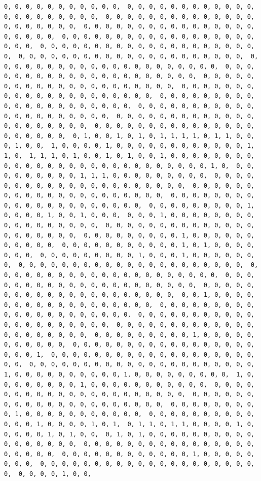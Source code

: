 \documentclass[
]{article}
\begin{document}
\begin{verbatim}
0, 0, 0, 0, 0, 0, 0, 0, 0, 0, 0,  0, 0, 0, 0, 0, 0, 0, 0, 0, 0, 0, 0, 0, 0, 0, 0, 0, 0, 0, 0, 0,  0, 0, 0, 0, 0, 0, 0, 0, 0, 0, 0, 0, 0, 0, 0, 0, 0, 0, 0, 0, 0,  0, 0, 0, 0, 0, 0, 0, 0, 0, 0, 0, 0, 0, 0, 0, 0, 0, 0, 0, 0, 0,  0, 0, 0, 0, 0, 0, 0, 0, 0, 0, 0, 0, 0, 0, 0, 0, 0, 0, 0, 0, 0,  0, 0, 0, 0, 0, 0, 0, 0, 0, 0, 0, 0, 0, 0, 0, 0, 0, 0, 0, 0, 0,  0, 0, 0, 0, 0, 0, 0, 0, 0, 0, 0, 0, 0, 0, 0, 0, 0, 0, 0, 0, 0,  0, 0, 0, 0, 0, 0, 0, 0, 0, 0, 0, 0, 0, 0, 0, 0, 0, 0, 0, 0, 0,  0, 0, 0, 0, 0, 0, 0, 0, 0, 0, 0, 0, 0, 0, 0, 0, 0, 0, 0, 0, 0,  0, 0, 0, 0, 0, 0, 0, 0, 0, 0, 0, 0, 0, 0, 0, 0, 0, 0, 0, 0, 0,  0, 0, 0, 0, 0, 0, 0, 0, 0, 0, 0, 0, 0, 0, 0, 0, 0, 0, 0, 0, 0,  0, 0, 0, 0, 0, 0, 0, 0, 0, 0, 0, 0, 0, 0, 0, 0, 0, 0, 0, 0, 0,  0, 0, 0, 0, 0, 0, 0, 0, 0, 0, 0, 0, 0, 0, 0, 0, 0, 0, 0, 0, 0,  0, 0, 0, 0, 0, 0, 0, 0, 0, 0, 0, 0, 0, 0, 0, 0, 0, 0, 0, 0, 0,  0, 0, 0, 0, 0, 0, 0, 0, 0, 0, 0, 0, 0, 0, 0, 0, 0, 0, 0, 0, 0,  0, 1, 0, 0, 1, 0, 1, 0, 1, 1, 1, 1, 0, 1, 1, 0, 0, 0, 1, 0, 0,  1, 0, 0, 0, 0, 1, 0, 0, 0, 0, 0, 0, 0, 0, 0, 0, 0, 0, 1, 1, 0,  1, 1, 1, 0, 1, 0, 0, 1, 0, 1, 0, 0, 1, 0, 0, 0, 0, 0, 0, 0, 0,  0, 0, 0, 0, 0, 0, 0, 0, 0, 0, 0, 0, 0, 0, 0, 0, 0, 0, 0, 1, 0,  0, 0, 0, 0, 0, 0, 0, 0, 0, 1, 1, 1, 0, 0, 0, 0, 0, 0, 0, 0, 0,  0, 0, 0, 0, 0, 0, 0, 0, 0, 0, 0, 0, 0, 0, 0, 0, 0, 0, 0, 0, 0,  0, 0, 0, 0, 0, 0, 0, 0, 0, 0, 0, 0, 0, 0, 0, 0, 0, 0, 0, 0, 0,  0, 0, 0, 0, 0, 0, 0, 0, 0, 0, 0, 0, 0, 0, 0, 0, 0, 0, 0, 0, 0,  0, 0, 0, 0, 0, 0, 0, 0, 0, 1, 0, 0, 0, 0, 1, 0, 0, 1, 0, 0, 0,  0, 0, 0, 1, 0, 0, 0, 0, 0, 0, 0, 0, 0, 0, 0, 0, 0, 0, 0, 0, 0,  0, 0, 0, 0, 0, 0, 0, 0, 0, 0, 0, 0, 0, 0, 0, 0, 0, 0, 0, 0, 0,  0, 0, 0, 0, 0, 0, 0, 0, 0, 1, 0, 0, 0, 0, 0, 0, 0, 0, 0, 0, 0,  0, 0, 0, 0, 0, 0, 0, 0, 0, 0, 0, 1, 0, 1, 0, 0, 0, 0, 0, 0, 0,  0, 0, 0, 0, 0, 0, 0, 0, 0, 1, 0, 0, 0, 1, 0, 0, 0, 0, 0, 0, 0,  0, 0, 0, 0, 0, 0, 0, 0, 0, 0, 0, 0, 0, 0, 0, 0, 0, 0, 0, 0, 0,  0, 0, 0, 0, 0, 0, 0, 0, 0, 0, 0, 0, 0, 0, 0, 0, 0, 0, 0, 0, 0,  0, 0, 0, 0, 0, 0, 0, 0, 0, 0, 0, 0, 0, 0, 0, 0, 0, 0, 0, 0, 0,  0, 0, 0, 0, 0, 0, 0, 0, 0, 0, 0, 0, 0, 0, 0, 0, 0, 0, 0, 0, 0,  0, 0, 1, 0, 0, 0, 0, 0, 0, 0, 0, 0, 0, 0, 0, 0, 0, 0, 0, 0, 0,  0, 0, 0, 0, 0, 0, 0, 0, 0, 0, 0, 0, 0, 0, 0, 0, 0, 0, 0, 0, 0,  0, 0, 0, 0, 0, 0, 0, 0, 0, 0, 0, 0, 0, 0, 0, 0, 0, 0, 0, 0, 0,  0, 0, 0, 0, 0, 0, 0, 0, 0, 0, 0, 0, 0, 0, 0, 0, 0, 0, 0, 0, 0,  0, 0, 0, 0, 0, 0, 0, 0, 0, 1, 0, 0, 0, 0, 0, 0, 0, 0, 0, 0, 0,  0, 0, 0, 0, 0, 0, 0, 0, 0, 0, 0, 0, 0, 0, 0, 0, 0, 0, 0, 0, 1,  0, 0, 0, 0, 0, 0, 0, 0, 0, 0, 0, 0, 0, 0, 0, 0, 0, 0, 0, 0, 0,  0, 0, 0, 0, 0, 0, 0, 0, 0, 0, 0, 0, 0, 0, 0, 0, 0, 0, 0, 0, 0,  1, 0, 0, 0, 0, 0, 0, 0, 0, 0, 0, 1, 0, 0, 0, 0, 0, 0, 0, 0, 0,  1, 0, 0, 0, 0, 0, 0, 0, 0, 1, 0, 0, 0, 0, 0, 0, 0, 0, 0, 0, 0,  0, 0, 0, 0, 0, 0, 0, 0, 0, 0, 0, 0, 0, 0, 0, 0, 0, 0, 0, 0, 0,  0, 0, 0, 0, 0, 0, 0, 0, 0, 0, 0, 0, 0, 0, 0, 0, 0, 0, 0, 0, 0,  0, 0, 0, 0, 0, 0, 0, 0, 0, 1, 0, 0, 0, 0, 0, 0, 0, 0, 0, 0, 0,  0, 0, 0, 0, 0, 0, 0, 0, 0, 0, 0, 0, 0, 1, 0, 0, 0, 0, 1, 0, 1,  0, 1, 1, 0, 1, 1, 0, 0, 0, 0, 1, 0, 0, 0, 0, 0, 1, 0, 1, 0, 0,  0, 1, 0, 1, 0, 0, 0, 0, 0, 0, 0, 0, 0, 0, 0, 0, 0, 0, 0, 0, 0,  0, 0, 0, 0, 0, 0, 0, 0, 0, 0, 0, 0, 0, 0, 0, 0, 0, 0, 0, 0, 0,  0, 0, 0, 0, 0, 0, 0, 0, 0, 0, 0, 0, 1, 0, 0, 0, 0, 0, 0, 0, 0,  0, 0, 0, 0, 0, 0, 0, 0, 0, 0, 0, 0, 0, 0, 0, 0, 0, 0, 0, 0, 0,  0, 0, 0, 0, 1, 0, 0, 
\end{verbatim}
\end{document}
